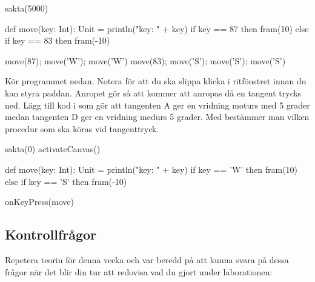 \begin{Code}
sakta(5000)

def move(key: Int): Unit =
  println("key: " + key)
  if key == 87 then fram(10)
  else if key == 83 then fram(-10)

move(87); move('W'); move('W')
move(83); move('S'); move('S'); move('S')
\end{Code}

\Subtask \label{subtask:keypress}  Kör programmet nedan. Notera  för att du ska slippa klicka i ritfönstret innan du kan styra paddan. Anropet  gör så att  kommer att anropas då en tangent trycks ned. Lägg till kod i  som gör att tangenten A ger en vridning moturs med 5 grader medan tangenten D ger en vridning medurs 5 grader. Med  bestämmer man vilken procedur som ska köras vid tangenttryck.

\begin{Code}
sakta(0)
activateCanvas()

def move(key: Int): Unit =
  println("key: " + key)
  if key == 'W' then fram(10)
  else if key == 'S' then fram(-10)

onKeyPress(move)
\end{Code}





\subsection{Kontrollfrågor}\Checkpoint

\noindent Repetera teorin för denna vecka och var beredd på att kunna svara på dessa frågor när det blir din tur att redovisa vad du gjort under laborationen:


